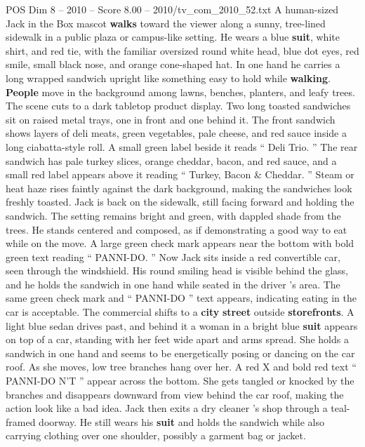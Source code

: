 \begin{textsample}{POS Dim 8 – 2010 – Score 8.00 – 2010/tv\_com\_2010\_52.txt}  \label{ex:f8_pos_023}
A human-sized Jack in the Box mascot \textbf{walks} toward the viewer along a sunny, tree-lined sidewalk in a public plaza or campus-like setting.
He wears a blue \textbf{suit}, white shirt, and red tie, with the familiar oversized round white head, blue dot eyes, red smile, small black nose, and orange cone-shaped hat.
In one hand he carries a long wrapped sandwich upright like something easy to hold while \textbf{walking}. \textbf{People} move in the background among lawns, benches, planters, and leafy trees.
The scene cuts to a dark tabletop product display.
Two long toasted sandwiches sit on raised metal trays, one in front and one behind it.
The front sandwich shows layers of deli meats, green vegetables, pale cheese, and red sauce inside a long ciabatta-style roll.
A small green label beside it reads “ Deli Trio. ” The rear sandwich has pale turkey slices, orange cheddar, bacon, and red sauce, and a small red label appears above it reading “ Turkey, Bacon \& Cheddar. ” Steam or heat haze rises faintly against the dark background, making the sandwiches look freshly toasted.
Jack is back on the sidewalk, still facing forward and holding the sandwich.
The setting remains bright and green, with dappled shade from the trees.
He stands centered and composed, as if demonstrating a good way to eat while on the move.
A large green check mark appears near the bottom with bold green text reading “ PANNI-DO. ” Now Jack sits inside a red convertible car, seen through the windshield.
His round smiling head is visible behind the glass, and he holds the sandwich in one hand while seated in the driver ’s area.
The same green check mark and “ PANNI-DO ” text appears, indicating eating in the car is acceptable.
The commercial shifts to a \textbf{city} \textbf{street} outside \textbf{storefronts}.
A light blue sedan drives past, and behind it a woman in a bright blue \textbf{suit} appears on top of a car, standing with her feet wide apart and arms spread.
She holds a sandwich in one hand and seems to be energetically posing or dancing on the car roof.
As she moves, low tree branches hang over her.
A red X and bold red text “ PANNI-DO N’T ” appear across the bottom.
She gets tangled or knocked by the branches and disappears downward from view behind the car roof, making the action look like a bad idea.
Jack then exits a dry cleaner ’s shop through a teal-framed doorway.
He still wears his \textbf{suit} and holds the sandwich while also carrying clothing over one shoulder, possibly a garment bag or jacket.

\end{textsample}
